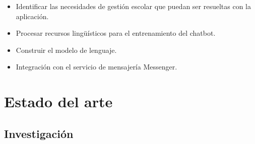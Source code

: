     \begin{itemize}
        \item Identificar las necesidades de gestión escolar que puedan ser resueltas con la aplicación.
        \item Procesar recursos lingüísticos para el entrenamiento del chatbot.
        \item Construir el modelo de lenguaje.
        \item Integración con el servicio de mensajería Messenger.
    \end{itemize}

\section{Estado del arte}
    \subsection{Investigación}
        
